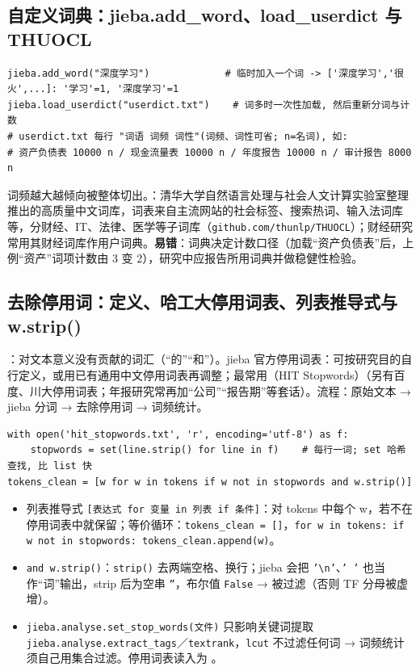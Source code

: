 \subsection{自定义词典：jieba.add\_word、load\_userdict 与 THUOCL}
\begin{lstlisting}[style=pyD08a]
jieba.add_word("深度学习")             # 临时加入一个词 -> ['深度学习','很火',...]: '学习'=1, '深度学习'=1
jieba.load_userdict("userdict.txt")    # 词多时一次性加载, 然后重新分词与计数
# userdict.txt 每行 "词语 词频 词性"(词频、词性可省; n=名词), 如:
# 资产负债表 10000 n / 现金流量表 10000 n / 年度报告 10000 n / 审计报告 8000 n
\end{lstlisting}
词频越大越倾向被整体切出。：清华大学自然语言处理与社会人文计算实验室整理推出的高质量中文词库，词表来自主流网站的社会标签、搜索热词、输入法词库等，分财经、IT、法律、医学等子词库（\texttt{github.com/thunlp/THUOCL}）；财经研究常用其财经词库作用户词典。\textbf{易错}：词典决定计数口径（加载“资产负债表”后，上例“资产”词项计数由 3 变 2），研究中应报告所用词典并做稳健性检验。

\subsection{去除停用词：定义、哈工大停用词表、列表推导式与 w.strip()}
：对文本意义没有贡献的词汇（“的”“和”）。jieba 官方停用词表：可按研究目的自行定义，或用已有通用中文停用词表再调整；最常用（HIT Stopwords）（另有百度、川大停用词表；年报研究常再加“公司”“报告期”等套话）。流程：原始文本 → jieba 分词 → 去除停用词 → 词频统计。
\begin{lstlisting}[style=pyD08a]
with open('hit_stopwords.txt', 'r', encoding='utf-8') as f:
    stopwords = set(line.strip() for line in f)    # 每行一词; set 哈希查找, 比 list 快
tokens_clean = [w for w in tokens if w not in stopwords and w.strip()]
\end{lstlisting}
\begin{itemize}
\item 列表推导式 \texttt{[表达式 for 变量 in 列表 if 条件]}：对 tokens 中每个 w，若不在停用词表中就保留；等价循环：\texttt{tokens\_clean = []}，\texttt{for w in tokens: if w not in stopwords: tokens\_clean.append(w)}。
\item \texttt{and w.strip()}：\texttt{strip()} 去两端空格、换行；jieba 会把 \texttt{'\textbackslash n'}、\texttt{' '} 也当作“词”输出，strip 后为空串 \texttt{''}，布尔值 \texttt{False} → 被过滤（否则 TF 分母被虚增）。
\item \texttt{jieba.analyse.set\_stop\_words(文件)} 只影响关键词提取 \texttt{jieba.analyse.extract\_tags}／\texttt{textrank}，\texttt{lcut} 不过滤任何词 → 词频统计须自己用集合过滤。停用词表读入为 \tagext。
\end{itemize}

